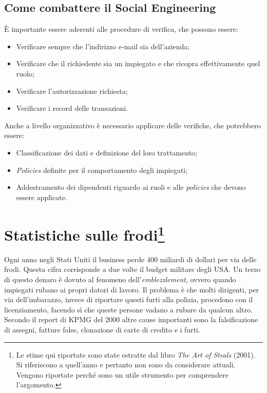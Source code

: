 \subsection{Come combattere il Social Engineering}

È importante essere aderenti alle procedure di verifica, che possono essere:
\begin{itemize}
  \item Verificare sempre che l'indirizzo e-mail sia dell'azienda;
  \item Verificare che il richiedente sia un impiegato e che ricopra
  effettivamente quel ruolo;
  \item Verificare l'autorizzazione richiesta;
  \item Verificare i record delle transazioni.
\end{itemize}

Anche a livello organizzativo è necessario applicare delle verifiche, che
potrebbero essere:
\begin{itemize}
  \item Classificazione dei dati e definizione del loro trattamento;
  \item \textit{Policies} definite per il comportamento degli impiegati;
  \item Addestramento dei dipendenti riguardo ai ruoli e alle \textit{policies}
che devono essere applicate.
\end{itemize}

\section[Statistiche sulle frodi]{
Statistiche sulle frodi\protect\footnote{
Le stime qui riportate sono state estratte dal libro
\textit{The Art of Steals} (2001). Si riferiscono
a quell'anno e pertanto non sono da considerare attuali.
Vengono riportate perché sono un utile strumento per
comprendere l'argomento.}}
Ogni anno negli Stati Uniti il business perde $400$ miliardi di dollari
per via delle frodi. Questa cifra corrisponde a due volte il budget
militare degli USA.
Un terzo di questo denaro è dovuto al fenomeno
dell'\textit{emblezzlement}, ovvero quando impiegati rubano ai propri
datori di lavoro.
Il problema è che molti dirigenti, per via dell'imbarazzo,
invece di riportare questi furti alla polizia, procedono con
il licenziamento, facendo sì che queste persone vadano a rubare da
qualcun altro.
Secondo il report di KPMG del 2000 altre cause importanti sono
la falsificazione di assegni, fatture false, clonazione di carte di
credito e i furti.

